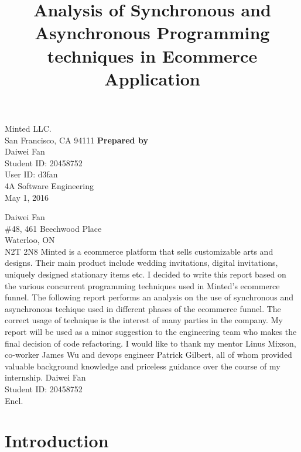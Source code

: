 \documentclass[12pt]{article}
\begin{document}
\title{Analysis of Synchronous and Asynchronous Programming techniques in Ecommerce Application}
{
	Minted LLC.\\
	San Francisco, CA 94111
}
{
	\textbf{Prepared by}\\[2ex]
	
	Daiwei Fan\\
	Student ID: 20458752\\
	User ID: d3fan\\
	4A Software Engineering\\
	May 1, 2016
}


{
	\noindent
	Daiwei Fan\\
	\#48, 461 Beechwood Place\\
	Waterloo, ON\\
	N2T 2N8
}
{
	Minted is a ecommerce platform that sells customizable arts and designs. Their main product include wedding invitations, digital invitations, uniquely designed stationary items etc. I decided to write this report based on the various concurrent programming techniques used in Minted's ecommerce funnel.
}
{
	The following report performs an analysis on the use of synchronous and asynchronous techique used in different phases of the ecommerce funnel. The correct usage of technique is the interest of many parties in the company. My report will be used as a minor suggestion to the engineering team who makes the final decision of code refactoring.
}
{
	I would like to thank my mentor Linus Mixson, co-worker James Wu and devops engineer Patrick Gilbert, all of whom provided valuable background knowledge and priceless guidance over the course of my internship.
}
{
	Daiwei Fan\\
	Student ID: 20458752\\[2ex]
	Encl.
}






\newpage

\tableofcontents
\newpage
\listoffigures
\newpage
\listoftables
\newpage


\section{Introduction}
\end{document}
